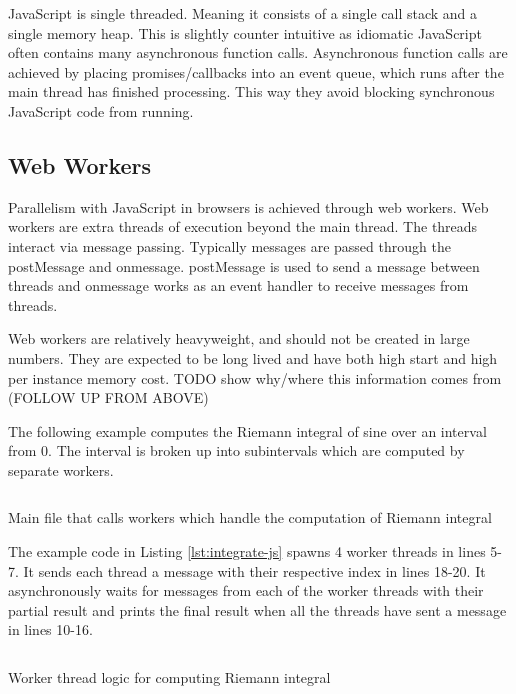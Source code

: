 \documentclass[11pt]{article}
\begin{document}
JavaScript is single threaded. Meaning it consists of a single call stack and a single memory heap. This is slightly counter intuitive as idiomatic JavaScript often contains many asynchronous function calls. Asynchronous function calls are achieved by placing promises/callbacks into an event queue, which runs after the main thread has finished processing. This way they avoid blocking synchronous JavaScript code from running. 



\subsection{Web Workers}
Parallelism with JavaScript in browsers is achieved through web workers. Web workers are extra threads of execution beyond the main thread. The threads interact via message passing. Typically messages are passed through the postMessage and onmessage. postMessage is used to send a message between threads and onmessage works as an event handler to receive messages from threads. 


Web workers are relatively heavyweight, and should not be created in large numbers. They are expected to be long lived and have both high start and high per instance memory cost. 
TODO show why/where this information comes from (FOLLOW UP FROM ABOVE)

The following example computes the Riemann integral of sine over an interval from 0. The interval is broken up into subintervals which are computed by separate workers.

\begin{listing}[H] 
        \inputminted[fontsize=\small,baselinestretch=0.5,linenos]{javascript}{code/worker/integrate.js}
        \caption{Main file that calls workers which handle the computation of Riemann integral} 
        
        \label{lst:integrate-js}    
\end{listing} 

The example code in Listing \ref{lst:integrate-js} spawns 4 worker threads in lines 5-7. It sends each thread a message with their respective index in lines 18-20. It asynchronously waits for messages from each of the worker threads with their partial result and prints the final result when all the threads have sent a message in lines 10-16.
\begin{listing}[H] 
        \inputminted[fontsize=\small,baselinestretch=0.5,linenos]{javascript}{code/worker/worker.js}
        \caption{Worker thread logic for computing Riemann integral} 
        \label{lst:worker-js}    
\end{listing}    
\end{document}
